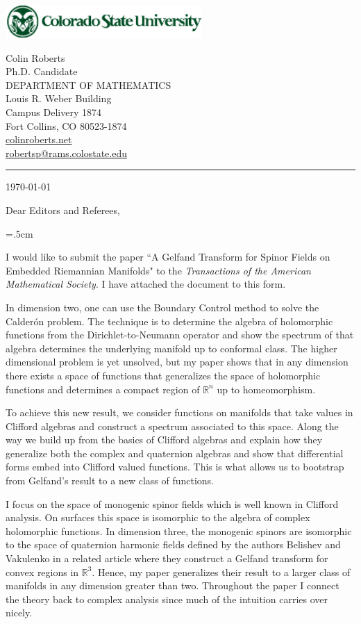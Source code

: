 \documentclass[12pt]{amsart}
\begin{document}
\noindent\includegraphics[width=7.5cm]{csuwrdmrk357.pdf}\\
{\begin{spacing}{0.95}\sf\footnotesize
 Colin Roberts\\
 Ph.D. Candidate\\
{\color{csugreen}DEPARTMENT OF MATHEMATICS}\\
Louis R. Weber Building\\
Campus Delivery 1874\\
Fort Collins, CO 80523-1874\\
\url{colinroberts.net}\\
\url{robertsp@rams.colostate.edu}\\
\end{spacing}
}
\smallskip
{\color{csugreen}\rule{12mm}{0.8mm}}\medskip

\today
\bigskip


\noindent Dear Editors and Referees,
\bigskip

\parindent=.5cm

I would like to submit the paper ``A Gelfand Transform for Spinor Fields on Embedded Riemannian Manifolds" to the \emph{Transactions of the American Mathematical Society}. I have attached the document to this form. 

In dimension two, one can use the Boundary Control method to solve the Calder\'on problem. The technique is to determine the algebra of holomorphic functions from the Dirichlet-to-Neumann operator and show the spectrum of that algebra determines the underlying manifold up to conformal class. The higher dimensional problem is yet unsolved, but my paper shows that in any dimension there exists a space of functions that generalizes the space of holomorphic functions and determines a compact region of $\mathbb{R}^n$ up to homeomorphism. 

To achieve this new result, we consider functions on manifolds that take values in Clifford algebras and construct a spectrum associated to this space. Along the way we build up from the basics of Clifford algebras and explain how they generalize both the complex and quaternion algebras and show that differential forms embed into Clifford valued functions. This is what allows us to bootstrap from Gelfand's result to a new class of functions.

I focus on the space of monogenic spinor fields which is well known in Clifford analysis. On surfaces this space is isomorphic to the algebra of complex holomorphic functions. In dimension three, the monogenic spinors are isomorphic to the space of quaternion harmonic fields defined by the authors Belishev and Vakulenko in a related article where they construct a Gelfand transform for convex regions in $\mathbb{R}^3$. Hence, my paper generalizes their result to a larger class of manifolds in any dimension greater than two. Throughout the paper I connect the theory back to complex analysis since much of the intuition carries over nicely. 
\end{document}
